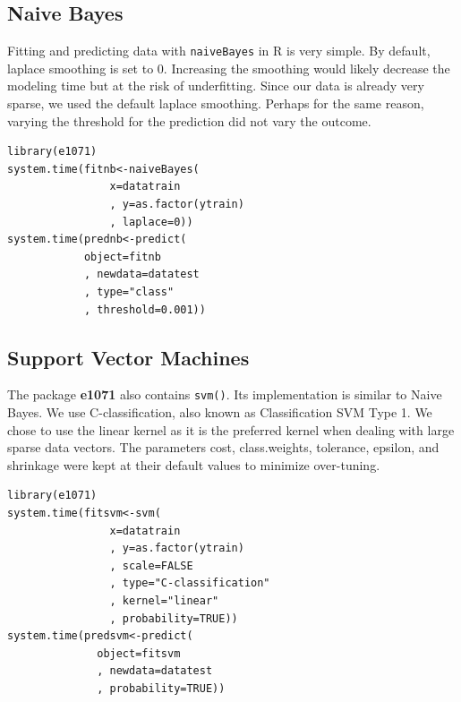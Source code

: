 \documentclass[twoside]{article}
\begin{document}
\begin{multicols}{2}
\subsection{Naive Bayes}
Fitting and predicting data with \texttt{naiveBayes} in R is very simple\cite{16}. By default, laplace smoothing is set to 0\cite{16}. Increasing the smoothing would likely decrease the modeling time but at the risk of underfitting. Since our data is already very sparse, we used the default laplace smoothing. Perhaps for the same reason, varying the threshold for the prediction did not vary the outcome.
\begin{verbatim}
library(e1071)
system.time(fitnb<-naiveBayes(
                x=datatrain
                , y=as.factor(ytrain)
                , laplace=0))
system.time(prednb<-predict(
            object=fitnb
            , newdata=datatest
            , type="class"
            , threshold=0.001))
\end{verbatim}

\subsection{Support Vector Machines}
The package \textbf{e1071} also contains \texttt{svm()}. Its implementation is similar to Naive Bayes\cite{24}. We use C-classification, also known as Classification SVM Type 1\cite{26}. We chose to use the linear kernel as it is the preferred kernel when dealing with large sparse data vectors\cite{23}. The parameters cost, class.weights, tolerance, epsilon, and shrinkage were kept at their default values\cite{24} to minimize over-tuning.
\begin{verbatim}
library(e1071)
system.time(fitsvm<-svm(
                x=datatrain
                , y=as.factor(ytrain)
                , scale=FALSE
                , type="C-classification"
                , kernel="linear"
                , probability=TRUE))
system.time(predsvm<-predict(
              object=fitsvm
              , newdata=datatest
              , probability=TRUE))
\end{verbatim}


\end{multicols}
\end{document}
